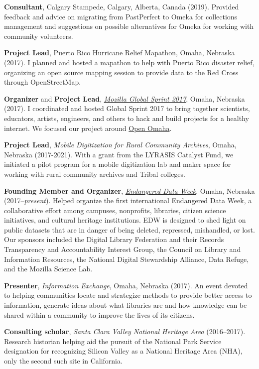 \textbf{Consultant}, Calgary Stampede, Calgary, Alberta, Canada (2019).
Provided feedback and advice on migrating from PastPerfect to Omeka for
collections management and suggestions on possible alternatives for
Omeka for working with community volunteers.

\textbf{Project Lead}, Puerto Rico Hurricane Relief Mapathon, Omaha,
Nebraska (2017). I planned and hosted a mapathon to help with Puerto
Rico disaster relief, organizing an open source mapping session to
provide data to the Red Cross through OpenStreetMap.

\textbf{Organizer} and \textbf{Project Lead},
\emph{\href{https://mozilla.github.io/global-sprint/}{Mozilla Global
Sprint 2017}}, Omaha, Nebraska (2017). I coordinated and hosted Global
Sprint 2017 to bring together scientists, educators, artists, engineers,
and others to hack and build projects for a healthy internet. We focused
our project around \href{http://github.com/open-omaha/}{Open Omaha}.

\textbf{Project Lead}, \emph{Mobile Digitization for Rural Community
Archives}, Omaha, Nebraska (2017-2021). With a grant from the LYRASIS
Catalyst Fund, we initiated a pilot program for a mobile digitization
lab and maker space for working with rural community archives and Tribal
colleges.

\textbf{Founding Member and Organizer},
\emph{\href{http://endangereddataweek.org}{Endangered Data Week}},
Omaha, Nebraska (2017--\emph{present}). Helped organize the first
international Endangered Data Week, a collaborative effort among
campuses, nonprofits, libraries, citizen science initiatives, and
cultural heritage institutions. EDW is designed to shed light on public
datasets that are in danger of being deleted, repressed, mishandled, or
lost. Our sponsors included the Digital Library Federation and their
Records Transparency and Accountability Interest Group, the Council on
Library and Information Resources, the National Digital Stewardship
Alliance, Data Refuge, and the Mozilla Science Lab.

\textbf{Presenter}, \emph{Information Exchange}, Omaha, Nebraska (2017).
An event devoted to helping communities locate and strategize methods to
provide better access to information, generate ideas about what
libraries are and how knowledge can be shared within a community to
improve the lives of its citizens.

\textbf{Consulting scholar}, \emph{Santa Clara Valley National Heritage
Area} (2016--2017). Research historian helping aid the pursuit of the
National Park Service designation for recognizing Silicon Valley as a
National Heritage Area (NHA), only the second such site in California.

